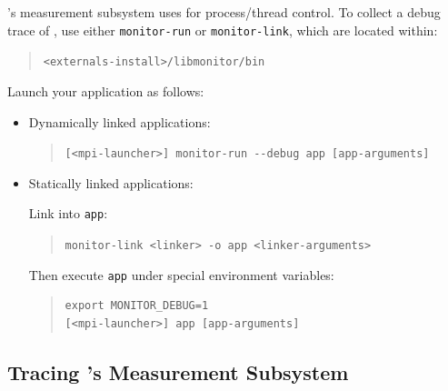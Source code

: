 \documentclass[11pt,letterpaper]{report}
\begin{document}
\HPCToolkit{}'s measurement subsystem
uses \libmonitor{} for process/thread control.
To collect a debug trace of \libmonitor{}, use either \texttt{monitor-run} or \texttt{monitor-link}, which are located within:
%
\begin{quote}
  \verb|<externals-install>/libmonitor/bin|
\end{quote}
Launch your application as follows:
%
\begin{itemize}

\item Dynamically linked applications:\hfill
\begin{quote}
  \verb|[<mpi-launcher>] monitor-run --debug app [app-arguments]|
\end{quote}

\item Statically linked applications:\hfill

Link \libmonitor{} into \texttt{app}:
\begin{quote}
  \verb|monitor-link <linker> -o app <linker-arguments>|
\end{quote}
%
Then execute \texttt{app} under special environment variables:
\begin{quote}
\begin{verbatim}
export MONITOR_DEBUG=1
[<mpi-launcher>] app [app-arguments]
\end{verbatim}
\end{quote}
\end{itemize}



\subsection{Tracing \HPCToolkit{}'s Measurement Subsystem}
\end{document}
